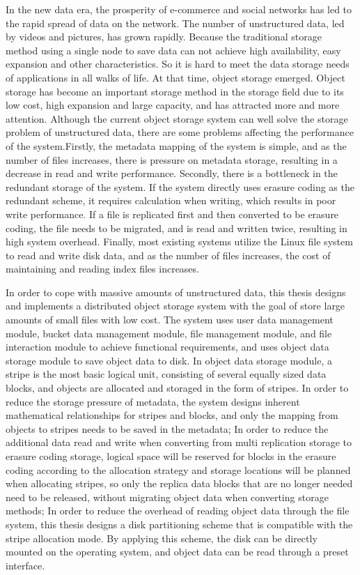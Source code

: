 \begin{abstract*}
In the new data era, the prosperity of e-commerce and social networks has led to the rapid spread of data on the network. The number of unstructured data, led by videos and pictures, has grown rapidly. Because the traditional storage method using a single node to save data can not achieve high availability, easy expansion and other characteristics. So it is hard to meet the data storage needs of applications in all walks of life. At that time, object storage emerged. Object storage has become an important storage method in the storage field due to its low cost, high expansion and large capacity, and has attracted more and more attention. Although the current object storage system can well solve the storage problem of unstructured data, there are some problems affecting the performance of the system.Firstly, the metadata mapping of the system is simple, and as the number of files increases, there is pressure on metadata storage, resulting in a decrease in read and write performance. Secondly, there is a bottleneck in the redundant storage of the system. If the system directly uses erasure coding as the redundant scheme, it requires calculation when writing, which results in poor write performance. If a file is replicated first and then converted to be erasure coding, the file needs to be migrated, and is read and written twice, resulting in high system overhead. Finally, most existing systems utilize the Linux file system to read and write disk data, and as the number of files increases, the cost of maintaining and reading index files increases.

In order to cope with massive amounts of unstructured data, this thesis designs and implements a distributed object storage system with the goal of store large amounts of small files with low cost. The system uses user data management module, bucket data management module, file management module, and file interaction module to achieve functional requirements, and uses object data storage module to save object data to disk. In object data storage module, a stripe is the most basic logical unit, consisting of several equally sized data blocks, and objects are allocated and storaged in the form of stripes. In order to reduce the storage pressure of metadata, the system designs inherent mathematical relationships for stripes and blocks, and only the mapping from objects to stripes needs to be saved in the metadata; In order to reduce the additional data read and write when converting from multi replication storage to erasure coding storage, logical space will be reserved for blocks in the erasure coding according to the allocation strategy and storage locations will be planned when allocating stripes, so only the replica data blocks that are no longer needed need to be released, without migrating object data when converting storage methods; In order to reduce the overhead of reading object data through the file system, this thesis designs a disk partitioning scheme that is compatible with the stripe allocation mode. By applying this scheme, the disk can be directly mounted on the operating system, and object data can be read through a preset interface.


\end{abstract*}

